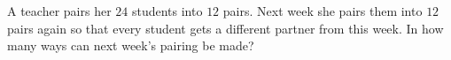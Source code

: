 A teacher pairs her $24$ students into $12$ pairs. Next week she pairs them into $12$ pairs again so that every student gets a different partner from this week. In how many ways can next week's pairing be made?
